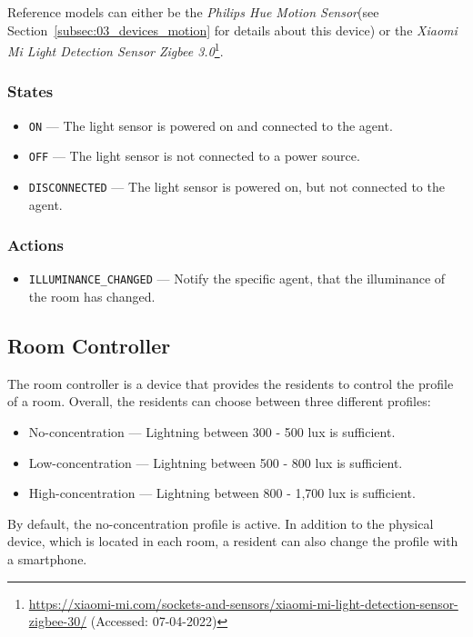 \documentclass[letterpaper, 11pt]{Proposal}
\def\Sec#1{Section~\ref{#1}}
\begin{document}
Reference models can either be the \textit{Philips Hue Motion Sensor}(see \Sec{subsec:03_devices_motion} for details about this device) or the
\textit{Xiaomi Mi Light Detection Sensor Zigbee 3.0}\footnote{\url{https://xiaomi-mi.com/sockets-and-sensors/xiaomi-mi-light-detection-sensor-zigbee-30/} (Accessed: 07-04-2022)}.

\subsubsection{States}
\begin{itemize}
    \item \texttt{ON} --- The light sensor is powered on and connected to the agent.
    \item \texttt{OFF} --- The light sensor is not connected to a power source.
    \item \texttt{DISCONNECTED} --- The light sensor is powered on, but not connected to the agent.
\end{itemize}

\subsubsection{Actions}
\begin{itemize}
    \item \texttt{ILLUMINANCE\_CHANGED} --- Notify the specific agent, that the illuminance of the room has changed.
\end{itemize}

\subsection{Room Controller}
The room controller is a device that provides the residents to control the profile
of a room.
Overall, the residents can choose between three different profiles:
\begin{itemize}
    \item No-concentration --- Lightning between 300 - 500 lux is sufficient.
    \item Low-concentration --- Lightning between 500 - 800 lux is sufficient.
    \item High-concentration --- Lightning between 800 - 1,700 lux is sufficient.
\end{itemize}
By default, the no-concentration profile is active.
In addition to the physical device, which is located in each room, a resident can
also change the profile with a smartphone.
\end{document}
